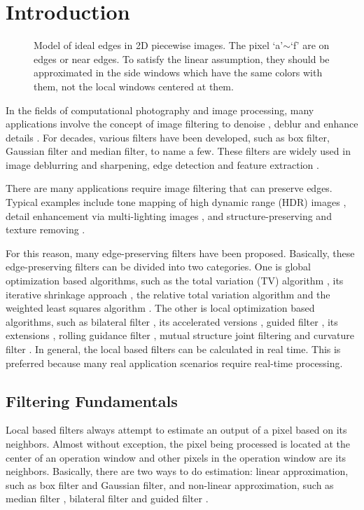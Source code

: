 \documentclass[10pt,twocolumn,letterpaper]{article}
\begin{document}
\section{Introduction}
\begin{figure}[!tbh]
	\centering
	\caption{Model of ideal edges in 2D piecewise images. The pixel `a'$\sim$`f' are on edges or near edges. To satisfy the linear assumption, they should be approximated in the side windows which have the same colors with them, not the local windows centered at them.}
	\label{edgeanalysis1}
\end{figure}
In the fields of computational photography and image processing, many applications involve the concept of image filtering to denoise \cite{denoise}, deblur \cite{deblur} and enhance details \cite{details}. For decades, various filters have been developed, such as box filter, Gaussian filter and median filter, to name a few. These filters are widely used in image deblurring and sharpening, edge detection and feature extraction \cite{book1}. 


There are many applications require image filtering that can preserve edges. Typical examples include tone mapping of high dynamic range (HDR) images \cite{hdr}, detail enhancement via multi-lighting images \cite{enhancement}, and structure-preserving and texture removing \cite{rtv}\cite{rgf}.

For this reason, many edge-preserving filters have been proposed. Basically, these edge-preserving filters can be divided into two categories. One is global optimization based algorithms, such as the total variation (TV) algorithm \cite{denoise}, its iterative shrinkage approach \cite{tv1}, the relative total variation  algorithm \cite{rtv} and the weighted least squares algorithm \cite{wls}. The other is local optimization based algorithms, such as bilateral filter \cite{bf}, its accelerated versions \cite{fbf}\cite{fbf1}\cite{fbf2}, guided filter \cite{gf}, its extensions \cite{wgf}\cite{ggf}, rolling guidance filter \cite{rgf}, mutual structure joint filtering \cite{msfjf} and curvature filter \cite{details}. In general, the local based filters can be calculated in real time. This is preferred because many real application scenarios require real-time processing. 

\subsection{Filtering Fundamentals}
Local based filters always attempt to estimate an output of a pixel based on its neighbors. Almost without exception, the pixel being processed is located at the center of an operation window and other pixels in the operation window are its neighbors. Basically, there are two ways to do estimation: linear approximation, such as box filter and Gaussian filter, and non-linear approximation, such as median filter \cite{mf}, bilateral filter \cite{bf} and guided filter \cite{gf}.  
\end{document}

